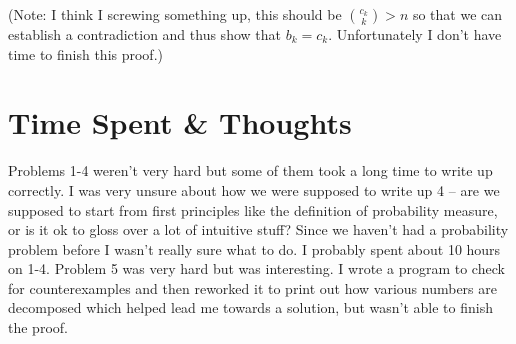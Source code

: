 \documentclass[12pt]{article}
\begin{document}
(Note: I think I screwing something up, this should be $\binom{c_k}{k}>n$ so that we can establish a contradiction and thus show that $b_k = c_k$. Unfortunately I don't have time to finish this proof.) 


\section{Time Spent \& Thoughts}
Problems 1-4 weren't very hard but some of them took a long time to write up correctly. I was very unsure about how we were supposed to write up 4 -- are we supposed to start from first principles like the definition of probability measure, or is it ok to gloss over a lot of intuitive stuff? Since we haven't had a probability problem before I wasn't really sure what to do. I probably spent about 10 hours on 1-4.
Problem 5 was very hard but was interesting. I wrote a program to check for counterexamples and then reworked it to print out how various numbers are decomposed which helped lead me towards a solution, but wasn't able to finish the proof.
\end{document}
